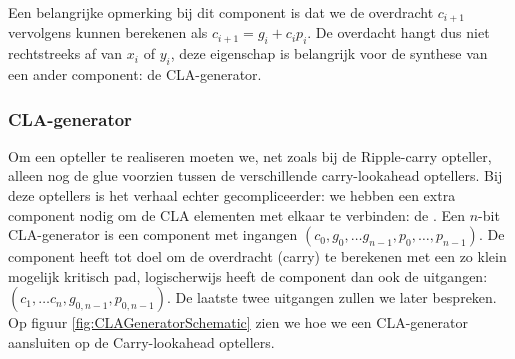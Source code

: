 Een belangrijke opmerking bij dit component is dat we de overdracht $c_{i+1}$ vervolgens kunnen berekenen als $c_{i+1}=g_i+c_ip_i$. De overdacht hangt dus niet rechtstreeks af van $x_i$ of $y_i$, deze eigenschap is belangrijk voor de synthese van een ander component: de CLA-generator.
\subsubsection{CLA-generator}
Om een opteller te realiseren moeten we, net zoals bij de Ripple-carry opteller, alleen nog de glue voorzien tussen de verschillende carry-lookahead optellers. Bij deze optellers is het verhaal echter gecompliceerder: we hebben een extra component nodig om de CLA elementen met elkaar te verbinden: de . Een $n$-bit CLA-generator is een component met ingangen $\left(c_0,g_0,\ldots g_{n-1},p_0,\ldots,p_{n-1}\right)$. De component heeft tot doel om de overdracht (carry) te berekenen met een zo klein mogelijk kritisch pad, logischerwijs heeft de component dan ook de uitgangen: $\left(c_1,\ldots c_n,g_{0,n-1},p_{0,n-1}\right)$. De laatste twee uitgangen zullen we later bespreken. Op figuur \ref{fig:CLAGeneratorSchematic} zien we hoe we een CLA-generator aansluiten op de Carry-lookahead optellers.
